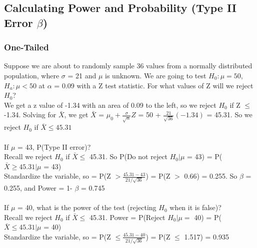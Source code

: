 \documentclass[12pt, a4paper]{article}
\begin{document}
	\subsection{Calculating Power and Probability (Type II Error $\beta$)}
		\subsubsection{One-Tailed}
		Suppose we are about to randomly sample 36 values from a normally distributed population, where $\sigma$ = 21 and $\mu$ is unknown. We are going to test $H_0: \mu = 50$, $H_a: \mu < 50$ at $\alpha$ = 0.09 with a Z test statistic. For what values of Z will we reject $H_0$? \\
		We get a z value of -1.34 with an area of 0.09 to the left, so we reject $H_0$ if Z $\leq$ -1.34. Solving for $\bar{X}$, we get $\bar{X}$ = $\mu_0 + \frac{\sigma}{\sqrt{n}}Z$ = 50 + $\frac{21}{\sqrt{36}}(-1.34)$ = 45.31. So we reject $H_0$ if $\bar{X} \leq 45.31$ \\~\\
		If $\mu$ = 43, P(Type II error)? \\
		Recall we reject $H_0$ if $\bar{X} \leq$ 45.31. So P(Do not reject $H_0 | \mu$ = 43) = P($\bar{X} \geq 45.31 | \mu$ = 43)\\ Standardize the variable, so = P(Z $> \frac{45.31-43}{21/\sqrt{36}}$) = P(Z $>$ 0.66) = 0.255. So $\beta$ = 0.255, and Power = 1- $\beta$ = 0.745 \\~\\
		If $\mu$ = 40, what is the power of the test (rejecting $H_0$ when it is false)? \\
		Recall we reject $H_0$ if $\bar{X} \leq$ 45.31. Power = P(Reject $H_0 | \mu =$ 40) = P($\bar{X} \leq 45.31 | \mu$ = 40) \\ Standardize the variable, so = P(Z $\leq \frac{45.31-40}{21/\sqrt{36}}$) = P(Z $\leq$ 1.517) = 0.935 \\~\\
		
\end{document}
